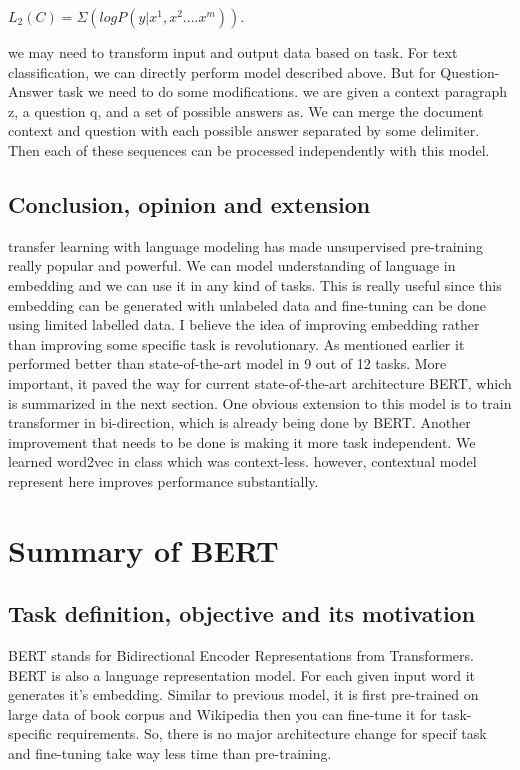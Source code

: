 \documentclass[11pt,a4paper]{article}
\begin{document}
$L_{2}(C) = \Sigma(log P(y| x^{1}, x^{2}....x^{m}))$.


we may need to transform input and output data based on task. For text classification, we can directly perform model described above. But for Question-Answer task we need to do some modifications. we are given a context paragraph z, a question q, and a set of possible answers as. We can merge the document context and question with each possible answer separated by some delimiter. Then each of these sequences can be processed independently with this model. 


\subsection{Conclusion, opinion and extension}
transfer learning with language modeling has made unsupervised pre-training really popular and powerful. We can model understanding of language in embedding and we can use it in any kind of tasks. This is really useful since this embedding can be generated with unlabeled data and fine-tuning can be done using limited labelled data. 
I believe the idea of improving embedding rather than improving some specific task is revolutionary. As mentioned earlier it performed better than state-of-the-art model in 9 out of 12 tasks. More important, it paved the way for current state-of-the-art architecture BERT, which is summarized in the next section. One obvious extension to this model is to train transformer in bi-direction, which is already being done by BERT. Another improvement that needs to be done is making it more task independent. We learned word2vec in class which was context-less. however, contextual model represent here improves performance substantially.

\section{Summary of BERT}

\subsection{Task definition, objective and its motivation}

BERT stands for Bidirectional Encoder Representations from Transformers. BERT is also a language representation model. For each given input word it generates it's embedding. Similar to previous model, it is first pre-trained on large data of book corpus and Wikipedia then you can fine-tune it for task-specific requirements. So, there is no major architecture change for specif task and fine-tuning take way less time than pre-training. 
\end{document}
